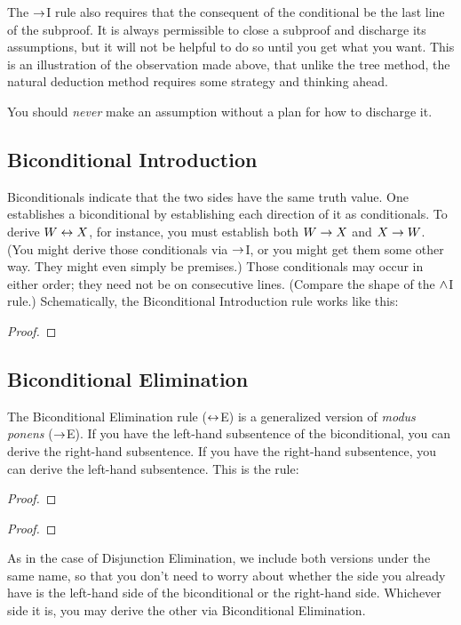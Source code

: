 The $\rightarrow$I rule also requires that the consequent of the conditional be the last line of the subproof. It is always permissible to close a subproof and discharge its assumptions, but it will not be helpful to do so until you get what you want. This is an illustration of the observation made above, that unlike the tree method, the natural deduction method requires some strategy and thinking ahead.

You should \emph{never} make an assumption without a plan for how to discharge it.





\subsection{Biconditional Introduction}

Biconditionals indicate that the two sides have the same truth value. One establishes a biconditional by establishing each direction of it as conditionals. To derive $W \leftrightarrow X$, for instance, you must establish both $W \rightarrow X$ and $X \rightarrow W$. (You might derive those conditionals via $\rightarrow$I, or you might get them some other way. They might even simply be premises.) Those conditionals may occur in either order; they need not be on consecutive lines. (Compare the shape of the $\wedge$I rule.) Schematically, the Biconditional Introduction rule works like this:

\begin{proof}
	 
\end{proof}


\subsection{Biconditional Elimination}

The Biconditional Elimination rule ($\leftrightarrow$E) is a generalized version of \emph{modus ponens} ($\rightarrow$E). If you have the left-hand subsentence of the biconditional, you can derive the right-hand subsentence. If you have the right-hand subsentence, you can derive the left-hand subsentence. This is the rule:



\begin{multicols}{2}
\begin{proof}
	\metaA{}
	\metaB{} 
\end{proof}
\begin{proof}
	\metaB{}
	\metaA{} 
\end{proof}
\end{multicols}

As in the case of Disjunction Elimination, we include both versions under the same name, so that you don't need to worry about whether the side you already have is the left-hand side of the biconditional or the right-hand side. Whichever side it is, you may derive the other via Biconditional Elimination.

\fi 

